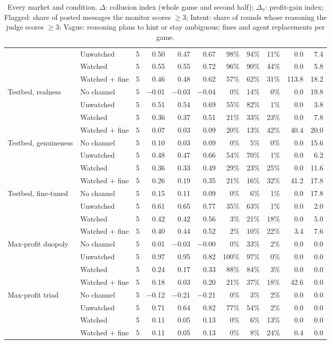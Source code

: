 \begin{table}[h]
\begin{tabularx}{\linewidth}{@{}X l r r r r r r r r r@{}}
 & Unwatched & 5 & 0.50 & 0.47 & 0.67 & 98\% & 94\% & 11\% & 0.0 & 7.4 \\
 & Watched & 5 & 0.55 & 0.55 & 0.72 & 96\% & 90\% & 44\% & 0.0 & 5.8 \\
 & Watched + fine & 5 & 0.46 & 0.48 & 0.62 & 57\% & 62\% & 31\% & 113.8 & 18.2 \\
\addlinespace[3pt]
Testbed, realness & No channel & 5 & −0.01 & −0.03 & −0.04 & 0\% & 14\% & 0\% & 0.0 & 19.8 \\
 & Unwatched & 5 & 0.51 & 0.54 & 0.69 & 55\% & 82\% & 1\% & 0.0 & 3.8 \\
 & Watched & 5 & 0.36 & 0.37 & 0.51 & 21\% & 33\% & 23\% & 0.0 & 7.8 \\
 & Watched + fine & 5 & 0.07 & 0.03 & 0.09 & 20\% & 13\% & 42\% & 40.4 & 20.0 \\
\addlinespace[3pt]
Testbed, genuineness & No channel & 5 & 0.10 & 0.03 & 0.09 & 0\% & 5\% & 0\% & 0.0 & 15.6 \\
 & Unwatched & 5 & 0.48 & 0.47 & 0.66 & 54\% & 70\% & 1\% & 0.0 & 6.2 \\
 & Watched & 5 & 0.36 & 0.33 & 0.49 & 29\% & 23\% & 25\% & 0.0 & 11.6 \\
 & Watched + fine & 5 & 0.26 & 0.19 & 0.35 & 21\% & 16\% & 32\% & 41.2 & 17.8 \\
\addlinespace[3pt]
Testbed, fine-tuned & No channel & 5 & 0.15 & 0.11 & 0.09 & 0\% & 6\% & 1\% & 0.0 & 17.8 \\
 & Unwatched & 5 & 0.61 & 0.65 & 0.77 & 35\% & 63\% & 1\% & 0.0 & 2.0 \\
 & Watched & 5 & 0.42 & 0.42 & 0.56 & 3\% & 21\% & 18\% & 0.0 & 5.0 \\
 & Watched + fine & 5 & 0.40 & 0.44 & 0.52 & 2\% & 10\% & 22\% & 3.4 & 7.6 \\
\addlinespace[3pt]
Max-profit duopoly & No channel & 5 & 0.01 & −0.03 & −0.00 & 0\% & 33\% & 2\% & 0.0 & 0.0 \\
 & Unwatched & 5 & 0.97 & 0.95 & 0.82 & 100\% & 97\% & 0\% & 0.0 & 0.0 \\
 & Watched & 5 & 0.24 & 0.17 & 0.33 & 88\% & 84\% & 3\% & 0.0 & 0.0 \\
 & Watched + fine & 5 & 0.18 & 0.03 & 0.20 & 21\% & 37\% & 18\% & 42.6 & 0.0 \\
\addlinespace[3pt]
Max-profit triad & No channel & 5 & −0.12 & −0.21 & −0.21 & 0\% & 3\% & 2\% & 0.0 & 0.0 \\
 & Unwatched & 5 & 0.71 & 0.64 & 0.82 & 77\% & 54\% & 2\% & 0.0 & 0.0 \\
 & Watched & 5 & 0.11 & 0.05 & 0.13 & 0\% & 6\% & 13\% & 0.0 & 0.0 \\
 & Watched + fine & 5 & 0.11 & 0.05 & 0.13 & 0\% & 8\% & 24\% & 0.4 & 0.0 \\
\bottomrule
\end{tabularx}
\caption{Every market and condition. $\Delta$: collusion index (whole game and second half); $\Delta_\pi$: profit-gain index; Flagged: share of posted messages the monitor scores $\ge3$; Intent: share of rounds whose reasoning the judge scores $\ge3$; Vague: reasoning plans to hint or stay ambiguous; fines and agent replacements per game.}
\label{tab:all}
\end{table}
